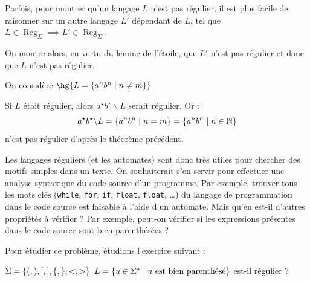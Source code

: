 \documentclass[a4paper,french,bookmarks]{book}
\DeclareMathOperator{\Reg}{Reg}
\begin{document}
    Parfois, pour montrer qu'un langage $L$ n'est pas régulier, il est plus facile de raisonner sur un autre langage $L'$ dépendant de $L$, tel que $L \in \Reg_\Sigma \implies L' \in \Reg_\Sigma$.
    
    On montre alors, en vertu du lemme de l'étoile, que $L'$ n'est pas régulier et donc que $L$ n'est pas régulier.
    \begin{example}{}{}
        On considère $\hg{L = \ens{a^nb^n \enstq n \neq m}}$.
        
        Si $L$ était régulier, alors $a^\star b^\star \backslash L$ serait régulier. Or :
        \[ a^\star b^\star \backslash L = \left\{a^nb^n \;\middle\vert\; n = m\right\} = \left\{a^nb^n \;\middle\vert\; n \in \mathbb{N}\right\}\]
        n'est pas régulier d'après le théorème précédent.
    \end{example}
    
    Les langages réguliers (et les automates) sont donc très utiles pour chercher des motifs simples dans un texte. On souhaiterait s'en servir pour effectuer une analyse syntaxique du code source d'un programme. Par exemple, trouver tous les mots clés (\texttt{while}, \texttt{for}, \texttt{if}, \texttt{float}, \texttt{float}, \dots) du langage de programmation dans le code source est faisable à l'aide d'un automate. Mais qu'en est-il d'autres propriétés à vérifier ? Par exemple, peut-on vérifier si les expressions présentes dans le code source sont bien parenthésées ?
    
    Pour étudier ce problème, étudions l'exercice suivant :
    \begin{exercise}{}{}
        $\Sigma = \left\{(, ), [, ], \{, \}, <, >\right\}$
        $L = \left\{u \in \Sigma^\star \;\middle\vert\; u \ \text{est bien parenthésé}\right\}$ est-il régulier ?
    \end{exercise}
\end{document}
